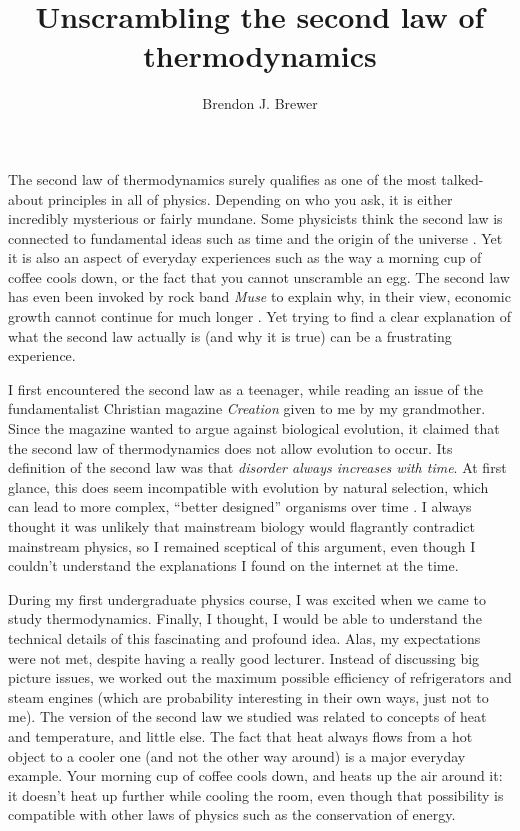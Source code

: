 \documentclass[a4paper, 12pt]{article}
\title{Unscrambling the second law of thermodynamics}
\author{Brendon J. Brewer}
\begin{document}
\sffamily
\maketitle

The second law of thermodynamics surely qualifies as one of the most
talked-about principles in all of physics. Depending on who you ask, it is
either incredibly mysterious or fairly mundane. Some physicists think
the second law is connected to
fundamental ideas such as time and the origin of the universe
\citep{carroll}. Yet it is also an aspect of everyday experiences
such as the way a morning cup of coffee cools down,
or the fact that you cannot unscramble an egg.
The second law has even been invoked by rock band {\em Muse} to
explain why, in their
view, economic growth cannot continue for much longer \citep{muse}.
Yet trying to find a clear explanation of what the second law actually is
(and why it is true) can be a frustrating experience.

I first encountered the second law
as a teenager, while reading an issue of the fundamentalist Christian magazine
{\em Creation} given to me by my grandmother. Since the magazine wanted to
argue against biological evolution, it claimed that the second law of
thermodynamics does not allow evolution to occur. Its definition of the second
law was that {\em disorder always increases with time}.
At first glance, this does seem incompatible with evolution by
natural selection, which can lead to more complex,
``better designed'' organisms over time \citep{dawkins}.
I always thought it was unlikely that mainstream biology would flagrantly
contradict mainstream physics, so I remained sceptical of this argument,
even though I couldn't understand the explanations I found on the
internet at the time.

During my first undergraduate physics course, I was excited when we came to
study thermodynamics. Finally, I thought, I would be able to understand the
technical details of this fascinating and profound idea.
Alas, my expectations were not met, despite having a really good lecturer.
Instead of discussing big picture issues, we
worked out the maximum possible efficiency of refrigerators and steam engines
(which are probability interesting in their own ways, just not to me).
The version of the second law we studied was related to concepts of heat
and temperature, and little else.
The fact that heat always flows from a hot object to a cooler
one (and not the other way around) is a major everyday example. Your morning
cup of coffee cools down, and heats up the air around it: it doesn't heat
up further while cooling the room, even though that possibility is compatible
with other laws of physics such as the conservation of energy.
\end{document}
